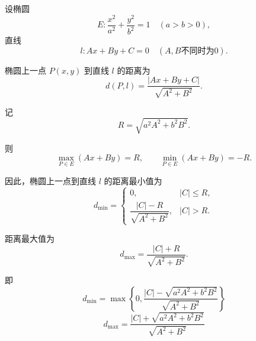 设椭圆
\[
	E:\frac{x^2}{a^2}+\frac{y^2}{b^2}=1\quad (a>b>0),
\]
直线
\[
	l:Ax+By+C=0\quad (A,B\text{不同时为}0).
\]

椭圆上一点 \(P(x,y)\) 到直线 \(l\) 的距离为
\[
	d(P,l)=\frac{|Ax+By+C|}{\sqrt{A^2+B^2}}.
\]

记
\[
	R=\sqrt{a^2A^2+b^2B^2}.
\]

则
\[
	\max_{P\in E}(Ax+By)=R,\qquad
	\min_{P\in E}(Ax+By)=-R.
\]

因此，椭圆上一点到直线 \(l\) 的距离最小值为
\[
	d_{\min}=
	\begin{cases}
		0,                             & |C|\le R, \\[4pt]
		\dfrac{|C|-R}{\sqrt{A^2+B^2}}, & |C|>R.
	\end{cases}
\]

距离最大值为
\[
	d_{\max}=\frac{|C|+R}{\sqrt{A^2+B^2}}.
\]

即
\[
	\boxed{
		d_{\min}=
		\max\left\{0,\frac{|C|-\sqrt{a^2A^2+b^2B^2}}{\sqrt{A^2+B^2}}\right\}
	}
\]
\[
	\boxed{
		d_{\max}=
		\frac{|C|+\sqrt{a^2A^2+b^2B^2}}{\sqrt{A^2+B^2}}
	}
\]